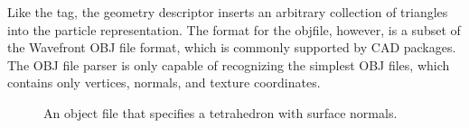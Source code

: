 Like the  tag, the  geometry descriptor inserts an arbitrary collection of triangles into
the particle representation.  The format for the objfile, however, is a subset of the Wavefront OBJ file format, which is commonly supported by CAD packages.  The OBJ file parser is only capable of recognizing the simplest OBJ files, which contains only vertices, normals, and texture coordinates.

\begin{figure}[!htb]
\begin{center}
\end{center}
\caption[An object file that specifies a tetrahedron with surface normals]{An object file that specifies a tetrahedron with surface normals.}
\label{fig:obj}
\end{figure}

